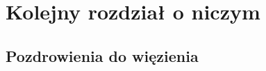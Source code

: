 \documentclass[a4paper,12pt]{book} %
\begin{document}
\chapter{Kolejny rozdział o niczym}
\section{Pozdrowienia do więzienia}
\lipsum[1]\cite{doersch2021tutorial}

\listoftables{} %

\listoffigures{} %





\end{document}
